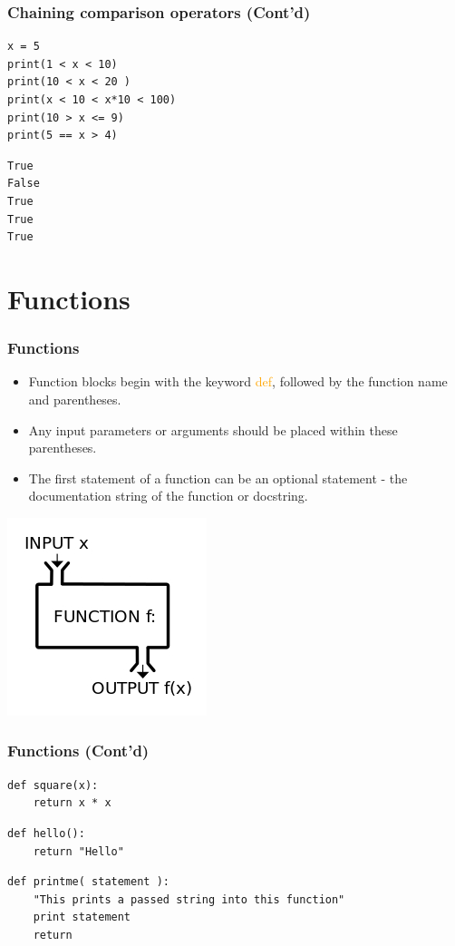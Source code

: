 \documentclass{../py-lecture}
\begin{document}
\begin{frame}[fragile]
  \frametitle{Chaining comparison operators (Cont'd)}
  \begin{verbatim}
x = 5
print(1 < x < 10)
print(10 < x < 20 )
print(x < 10 < x*10 < 100)
print(10 > x <= 9)
print(5 == x > 4)
  \end{verbatim}
  \begin{verbatim}
True
False
True
True
True
  \end{verbatim}
\end{frame}

\section{Functions}

\begin{frame}
	\frametitle{Functions}
  \begin{itemize}
    \item Function blocks begin with the keyword \textcolor{Orange}{def},
    followed by the function name and parentheses.
    \item Any input parameters or arguments should be placed
    within these parentheses.
    \item The first statement of a function can be an optional statement -
    the documentation string of the function or docstring.
  \end{itemize}
	\centering \includegraphics[width=.4\textwidth]{img/functions.jpg}
\end{frame}

\begin{frame}[fragile]
	\frametitle{Functions (Cont'd)}
  \begin{verbatim}
def square(x):
    return x * x
  \end{verbatim}
  \begin{verbatim}
def hello():
    return "Hello"
  \end{verbatim}
  \begin{verbatim}
def printme( statement ):
    "This prints a passed string into this function"
    print statement
    return
  \end{verbatim}
\end{frame}
\end{document}
